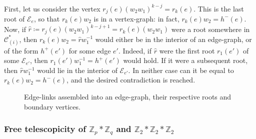 \documentclass[10pt,a4paper]{amsart}
\makeatletter
\theoremstyle{definition}
\let\sourceMathTruncateMacro\pgfmathtruncatemacro
\def\sourceConsumeMathSemicolon{\@ifnextchar;{\@gobble}{}}
\def\pgfmathtruncatemacro#1#2{\sourceMathTruncateMacro{#1}{#2}\sourceConsumeMathSemicolon}
\newcommand{\ZZ}{\mathbb{Z}}
\newcommand{\cC}{\mathcal{C}}
\newcommand{\cE}{\mathcal{E}}
\makeatother
\begin{document}
\begin{enumerate}[S.\arabic*]
First, let us consider the vertex $r_j(e)(w_{2}w_{1})^{k-j} = r_k(e)$. This is the last root of $\cE_e$, so that $r_k(e)w_{2}$ is in a vertex-graph: in fact, $r_k(e)w_{2}=h^-(e)$. Now, if $\widehat{r} \coloneqq r_j(e)(w_{2}w_{1})^{k-j+1} = r_k(e)(w_{2}w_{1})$ were a root somewhere in $\cC^*_{(i)}$, then $r_k(e)w_{2} = \widehat{r}w_{1}^{-1}$ would either be in the interior of an edge-graph, or of the form $h^+(e')$ for some edge $e'$. Indeed, if $\widehat{r}$ were the first root $r_1(e')$ of some $\cE_{e'}$, then $r_1(e')w_{1}^{-1} = h^+(e')$ would hold. If it were a subsequent root, then $\widehat{r}w_{1}^{-1}$ would lie in the interior of $\cE_{e'}$. In neither case can it be equal to $r_k(e)w_{2} = h^-(e)$, and the desired contradiction is reached.
\end{enumerate}

\begin{figure}[htb]
\centering
\caption{Edge-links assembled into an edge-graph, their respective roots and boundary vertices.}\label{fig:edge-graph-embedding}
\end{figure}

 
\subsubsection{Free telescopicity of $\ZZ_p*\ZZ_q$ and $\ZZ_{2}*\ZZ_{2}*\ZZ_{2}$}\label{sssection:proof-of-telescopicity}
\end{document}
